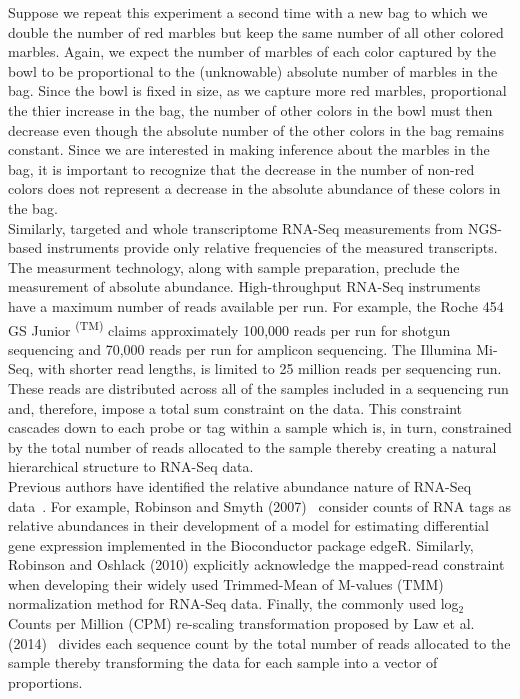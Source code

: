 \documentclass{article}\usepackage[]{graphicx}\usepackage[]{color}
\theoremstyle{definition}
\begin{document}
Suppose we repeat this experiment a second time with a new bag to which we double the number of red marbles but keep the same number of all other colored marbles.  Again, we expect the number of marbles of each color captured by the bowl to be proportional to the (unknowable) absolute number of marbles in the bag.  Since the bowl is fixed in size, as we capture more red marbles, proportional the thier increase in the bag, the number of other colors in the bowl must then decrease even though the absolute number of the other colors in the bag remains constant.  Since we are interested in making inference about the marbles in the bag, it is important to recognize that the decrease in the number of non-red colors does not represent a decrease in the absolute abundance of these colors in the bag.\\


Similarly, targeted and whole transcriptome RNA-Seq measurements from NGS-based instruments provide only relative frequencies of the measured transcripts.  The measurment technology, along with sample preparation, preclude the measurement of absolute abundance. High-throughput RNA-Seq instruments have a maximum number of reads available per run.  For example, the Roche 454 GS Junior \textsuperscript{(TM)} claims approximately 100,000 reads per run for shotgun sequencing and 70,000 reads per run for amplicon sequencing.  The Illumina Mi-Seq, with shorter read lengths, is limited to 25 million reads per sequencing run.  These reads are distributed across all of the samples included in a sequencing run and, therefore, impose a total sum constraint on the data.  This constraint cascades down to each probe or tag within a sample which is, in turn, constrained by the total number of reads allocated to the sample thereby creating a natural hierarchical structure to RNA-Seq data.\\

Previous authors have identified the relative abundance nature of RNA-Seq data~\cite{Robinson2007, Anders2010, Robinson2010, Law2014, Lovell2015}.  For example, Robinson and Smyth (2007)~\cite{Robinson2007} consider counts of RNA tags as relative abundances in their development of a model for estimating differential gene expression implemented in the Bioconductor package edgeR.  Similarly, Robinson and Oshlack (2010) explicitly acknowledge the mapped-read constraint when developing their widely used Trimmed-Mean of M-values (TMM) normalization method for RNA-Seq data. Finally, the commonly used log$_2$ Counts per Million (CPM) re-scaling transformation proposed by Law et al. (2014)~\cite{Law2014} divides each sequence count by the total number of reads allocated to the sample thereby transforming the data for each sample into a vector of proportions. \\%
\end{document}
